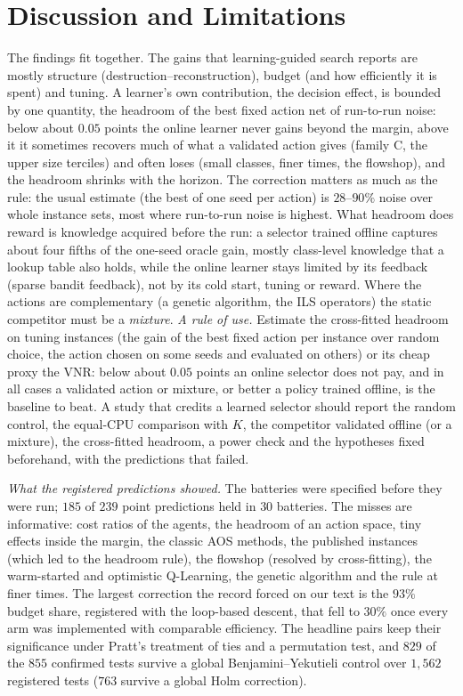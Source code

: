 \documentclass[conference,a4paper]{IEEEtran}
\begin{document}


\section{Discussion and Limitations}
The findings fit together. The gains that learning-guided search reports are mostly structure (destruction--reconstruction), budget (and how efficiently it is spent) and tuning. A learner's own contribution, the decision effect, is bounded by one quantity, the headroom of the best fixed action net of run-to-run noise: below about $0.05$ points the online learner never gains beyond the margin, above it it sometimes recovers much of what a validated action gives (family C, the upper size terciles) and often loses (small classes, finer times, the flowshop), and the headroom shrinks with the horizon. The correction matters as much as the rule: the usual estimate (the best of one seed per action) is $28$--$90\%$ noise over whole instance sets, most where run-to-run noise is highest.
What headroom does reward is knowledge acquired before the run: a selector trained offline captures about four fifths of the one-seed oracle gain, mostly class-level knowledge that a lookup table also holds, while the online learner stays limited by its feedback (sparse bandit feedback), not by its cold start, tuning or reward. Where the actions are complementary (a genetic algorithm, the ILS operators) the static competitor must be a \emph{mixture}.
\emph{A rule of use.} Estimate the cross-fitted headroom on tuning instances (the gain of the best fixed action per instance over random choice, the action chosen on some seeds and evaluated on others) or its cheap proxy the VNR: below about $0.05$ points an online selector does not pay, and in all cases a validated action or mixture, or better a policy trained offline, is the baseline to beat. A study that credits a learned selector should report the random control, the equal-CPU comparison with $K$, the competitor validated offline (or a mixture), the cross-fitted headroom, a power check and the hypotheses fixed beforehand, with the predictions that failed.

\emph{What the registered predictions showed.} The batteries were specified before they were run; $185$ of $239$ point predictions held in $30$ batteries. The misses are informative: cost ratios of the agents, the headroom of an action space, tiny effects inside the margin, the classic AOS methods, the published instances (which led to the headroom rule), the flowshop (resolved by cross-fitting), the warm-started and optimistic Q-Learning, the genetic algorithm and the rule at finer times. The largest correction the record forced on our text is the $93\%$ budget share, registered with the loop-based descent, that fell to $30\%$ once every arm was implemented with comparable efficiency.
The headline pairs keep their significance under Pratt's treatment of ties and a permutation test, and $829$ of the $855$ confirmed tests survive a global Benjamini--Yekutieli control over $1{,}562$ registered tests ($763$ survive a global Holm correction).
\end{document}
